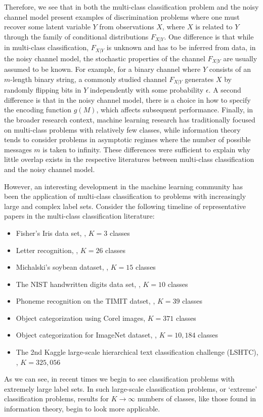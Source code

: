 Therefore, we see that in both the multi-class classification problem
and the noisy channel model present examples of discrimination
problems where one must recover some latent variable $Y$ from
observations $X$, where $X$ is related to $Y$ through the family of
conditional distributions $F_{X|Y}$.  One difference is that while in
multi-class classification, $F_{X|Y}$ is unknown and has to be
inferred from data, in the noisy channel model, the stochastic
properties of the channel $F_{X|Y}$ are usually assumed to be known.
For example, for a binary channel where $Y$ consists of an $m$-length
binary string, a commonly studied channel $F_{X|Y}$ generates $X$ by
randomly flipping bits in $Y$ independently with some probability
$\epsilon$.  A second difference is that in the noisy channel model,
there is a choice in how to specify the encoding function $g(M)$,
which affects subsequent performance.  Finally, in the broader
research context, machine learning research has traditionally focused
on multi-class problems with relatively few classes, while information
theory tends to consider problems in asymptotic regimes where the
number of possible messages $m$ is taken to infinity. These
differences were sufficient to explain why little overlap exists in
the respective literatures between multi-class classification and the
noisy channel model.  

However, an interesting development in the machine learning community
has been the application of multi-class classification to problems
with increasingly large and complex label sets.  Consider the
following timeline of representative papers in the multi-class
classification literature:
\begin{itemize}
\item Fisher's Iris data set, \cite{fisher1936use}, $K = 3$ classes
\item Letter recognition, \cite{frey1991letter}, $K = 26$ classes
\item Michalski's soybean dataset, \cite{mickalstd1980learning}, $K = 15$ classes
\item The NIST handwritten digits data set, \cite{grother1995nist}, $K = 10$ classes
\item Phoneme recognition on the TIMIT datset, \cite{clarkson1999use}, $K = 39$ classes
\item Object categorization using Corel images, \cite{duygulu2002object} $K = 371$ classes
\item Object categorization for ImageNet dataset, \cite{deng2010does}, $K = 10,184$ classes
\item The 2nd Kaggle large-scale hierarchical text classification challenge (LSHTC), \cite{partalas2015lshtc}, $K = 325,056$
\end{itemize}
As we can see, in recent times we begin to see classification problems
with extremely large label sets.  In such large-scale classification
problems, or `extreme' classification problems, results for $K \to
\infty$ numbers of classes, like those found in information theory,
begin to look more applicable.

